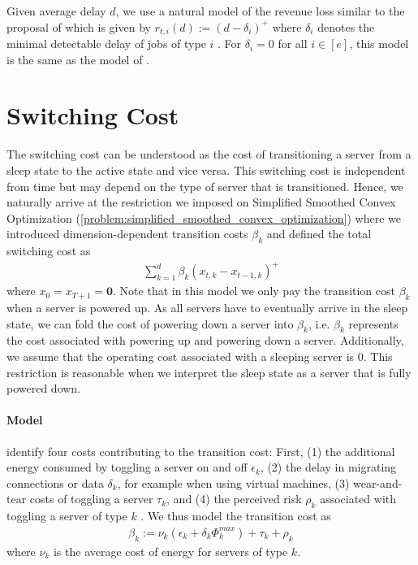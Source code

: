 Given average delay $d$, we use a natural model of the revenue loss similar to the proposal of \citeauthor*{Lin2011} which is given by $r_{t,i}(d) := (d - \delta_i)^+$ where $\delta_i$ denotes the minimal detectable delay of jobs of type $i$ \cite{Lin2011}. For $\delta_i = 0$ for all $i \in [e]$, this model is the same as the model of \cite{Lin2012}.

\section{Switching Cost}

The switching cost can be understood as the cost of transitioning a server from a sleep state to the active state and vice versa. This switching cost is independent from time but may depend on the type of server that is transitioned. Hence, we naturally arrive at the restriction we imposed on Simplified Smoothed Convex Optimization (\autoref{problem:simplified_smoothed_convex_optimization}) where we introduced dimension-dependent transition costs $\beta_k$ and defined the total switching cost as \begin{align*}
    \sum_{k=1}^d \beta_k (x_{t,k} - x_{t-1,k})^+
\end{align*} where $x_0 = x_{T+1} = \mathbf{0}$. Note that in this model we only pay the transition cost $\beta_k$ when a server is powered up. As all servers have to eventually arrive in the sleep state, we can fold the cost of powering down a server into $\beta_k$, i.e. $\beta_k$ represents the cost associated with powering up and powering down a server. Additionally, we assume that the operating cost associated with a sleeping server is $0$. This restriction is reasonable when we interpret the sleep state as a server that is fully powered down.

\paragraph{Model} \citeauthor*{Lin2011} identify four costs contributing to the transition cost: First, (1) the additional energy consumed by toggling a server on and off $\epsilon_k$, (2) the delay in migrating connections or data $\delta_k$, for example when using virtual machines, (3) wear-and-tear costs of toggling a server $\tau_k$, and (4) the perceived risk $\rho_k$ associated with toggling a server of type $k$ \cite{Lin2011}. We thus model the transition cost as \begin{align*}
    \beta_k := \nu_k(\epsilon_k + \delta_k \Phi_k^{max}) + \tau_k + \rho_k
\end{align*} where $\nu_k$ is the average cost of energy for servers of type $k$.

